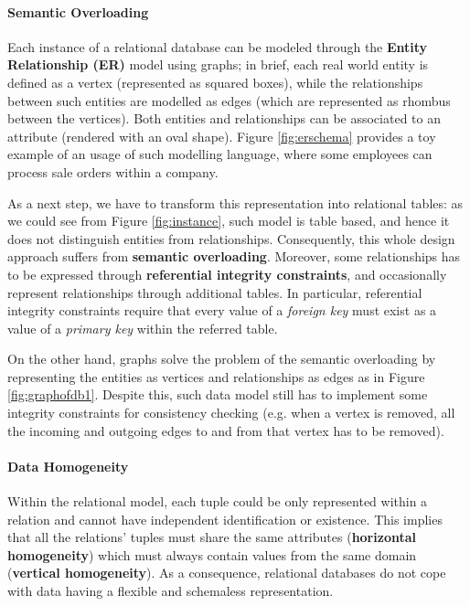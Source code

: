 \paragraph*{Semantic Overloading}\label{subsec:semanticoverloadrel}
Each instance of a relational database can be modeled through the \textbf{Entity Relationship (ER)} model  \cite{Chen1976} using graphs; in brief, each real world entity is defined as a vertex (represented as squared boxes), while the relationships between such entities are modelled as edges (which are represented as rhombus between the vertices). Both entities and relationships can be associated to an attribute (rendered with an oval shape). Figure \ref{fig:erschema} provides a toy example of an usage of such modelling language, where some employees can process sale orders within a company. 

As a next step, we have to transform this representation into relational tables: as we could see from Figure \ref{fig:instance}, such model is table based, and hence it does not distinguish  entities from relationships. Consequently, this whole design approach suffers from \textbf{semantic overloading}. Moreover, some relationships has to be expressed through \textbf{referential integrity constraints}, and occasionally represent relationships through additional tables. In particular, {referential integrity constraints} require that every value of a \textit{foreign key} must exist as a value of a \textit{primary key} within the referred table. 

On the other hand, graphs solve the problem of the semantic overloading by representing the entities as vertices and relationships as edges as in Figure \ref{fig:graphofdb1}. Despite this, such data model still has to implement some integrity constraints for consistency checking (e.g. when a vertex is removed, all the incoming and outgoing edges to and from that vertex has to be removed).

\paragraph*{Data Homogeneity}\label{par:homog}
Within the relational model, each tuple could be only represented within a relation and cannot have independent identification or existence. This  implies that all the relations' tuples must share the same attributes (\textbf{horizontal homogeneity}) which must always contain values from the same domain (\textbf{vertical homogeneity}). As a consequence, relational databases do not cope  with data  having a flexible and schemaless representation. 

